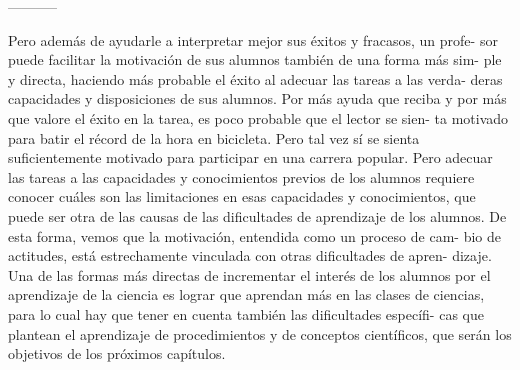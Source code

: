 -----------

Pero además de ayudarle a interpretar mejor sus éxitos y fracasos, un profe- sor puede facilitar la motivación de sus alumnos también de una forma más sim- ple y directa, haciendo más probable el éxito al adecuar las tareas a las verda- deras capacidades y disposiciones de sus alumnos. Por más ayuda que reciba y por más que valore el éxito en la tarea, es poco probable que el lector se sien- ta motivado para batir el récord de la hora en bicicleta. Pero tal vez sí se sienta suficientemente motivado para participar en una carrera popular. Pero adecuar las tareas a las capacidades y conocimientos previos de los alumnos requiere conocer cuáles son las limitaciones en esas capacidades y conocimientos, que puede ser otra de las causas de las dificultades de aprendizaje de los alumnos. De esta forma, vemos que la motivación, entendida como un proceso de cam- bio de actitudes, está estrechamente vinculada con otras dificultades de apren- dizaje. Una de las formas más directas de incrementar el interés de los alumnos por el aprendizaje de la ciencia es lograr que aprendan más en las clases de ciencias, para lo cual hay que tener en cuenta también las dificultades específi- cas que plantean el aprendizaje de procedimientos y de conceptos científicos, que serán los objetivos de los próximos capítulos.
